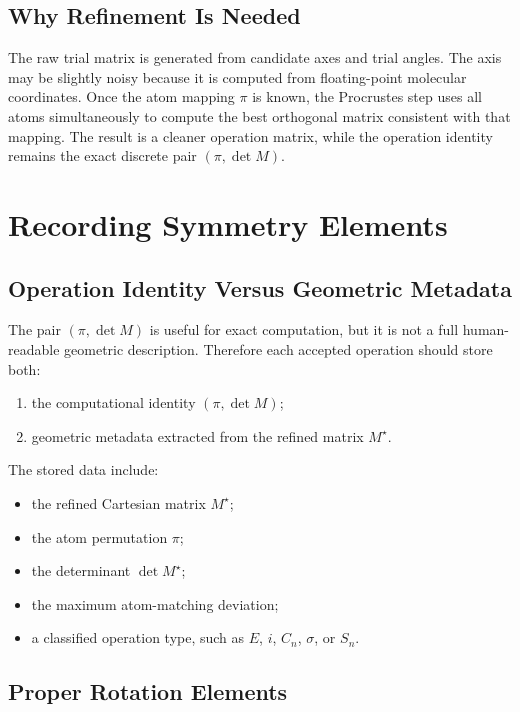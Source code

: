 \documentclass[11pt]{article}
\begin{document}
\subsection{Why Refinement Is Needed}

The raw trial matrix is generated from candidate axes and trial angles.  The
axis may be slightly noisy because it is computed from floating-point molecular
coordinates.  Once the atom mapping \(\pi\) is known, the Procrustes step uses
all atoms simultaneously to compute the best orthogonal matrix consistent with
that mapping.  The result is a cleaner operation matrix, while the operation
identity remains the exact discrete pair \((\pi,\det M)\).

\section{Recording Symmetry Elements}

\subsection{Operation Identity Versus Geometric Metadata}

The pair \((\pi,\det M)\) is useful for exact computation, but it is not a full
human-readable geometric description.  Therefore each accepted operation should
store both:
\begin{enumerate}[label=(\alph*)]
    \item the computational identity \((\pi,\det M)\);
    \item geometric metadata extracted from the refined matrix \(M^\star\).
\end{enumerate}
The stored data include:
\begin{itemize}
    \item the refined Cartesian matrix \(M^\star\);
    \item the atom permutation \(\pi\);
    \item the determinant \(\det M^\star\);
    \item the maximum atom-matching deviation;
    \item a classified operation type, such as \(E\), \(i\), \(C_n\),
    \(\sigma\), or \(S_n\).
\end{itemize}

\subsection{Proper Rotation Elements}
\end{document}
